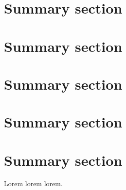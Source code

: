\documentclass[english,master,unicode]{ctufit-thesis}
\theoremstyle{plain}
\theoremstyle{definition}
\theoremstyle{remark}
\numberwithin{theorem}{chapter}
\begin{document}
\begin{summarypage}
  \section*{Summary section}

  \lipsum[1][1-8]

  \section*{Summary section}

  \lipsum[2][1-6]

  \section*{Summary section}

  \lipsum[3]

  \section*{Summary section}

  \lipsum[2]

  \section*{Summary section}

  \lipsum[1][1-8] Lorem lorem lorem.
\end{summarypage}

\printglossaries


\mainmatter\mainmatterinit %


\setcounter{page}{1}











\appendix\appendixinit %

\backmatter %

\printbibliography %

\end{document}
